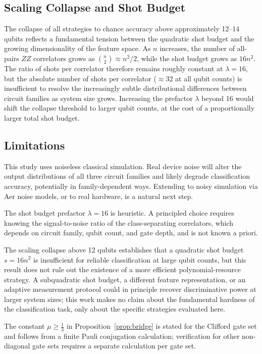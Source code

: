 \documentclass[conference]{IEEEtran}
\newcommand{\nqubits}{n}
\newcommand{\shots}{s}
\begin{document}
\subsection{Scaling Collapse and Shot Budget}

The collapse of all strategies to chance accuracy above approximately 12--14 qubits reflects a fundamental tension between the quadratic shot budget and the growing dimensionality of the feature space.
As $\nqubits$ increases, the number of all-pairs $ZZ$ correlators grows as $\binom{\nqubits}{2} \approx \nqubits^2/2$, while the shot budget grows as $16\nqubits^2$.
The ratio of shots per correlator therefore remains roughly constant at $\lambda = 16$, but the absolute number of shots per correlator ($\approx 32$ at all qubit counts) is insufficient to resolve the increasingly subtle distributional differences between circuit families as system size grows.
Increasing the prefactor $\lambda$ beyond 16 would shift the collapse threshold to larger qubit counts, at the cost of a proportionally larger total shot budget.

\subsection{Limitations}

This study uses noiseless classical simulation.
Real device noise will alter the output distributions of all three circuit families and likely degrade classification accuracy, potentially in family-dependent ways.
Extending to noisy simulation via Aer noise models, or to real hardware, is a natural next step.

The shot budget prefactor $\lambda = 16$ is heuristic.
A principled choice requires knowing the signal-to-noise ratio of the class-separating correlators, which depends on circuit family, qubit count, and gate depth, and is not known a priori.

The scaling collapse above 12 qubits establishes that a quadratic shot budget $\shots = 16\nqubits^2$ is insufficient for reliable classification at large qubit counts, but this result does not rule out the existence of a more efficient polynomial-resource strategy.
A subquadratic shot budget, a different feature representation, or an adaptive measurement protocol could in principle recover discriminative power at larger system sizes; this work makes no claim about the fundamental hardness of the classification task, only about the specific strategies evaluated here.

The constant $\mu \geq \frac{1}{3}$ in Proposition~\ref{prop:bridge} is stated for the Clifford gate set and follows from a finite Pauli conjugation calculation; verification for other non-diagonal gate sets requires a separate calculation per gate set.
\end{document}
